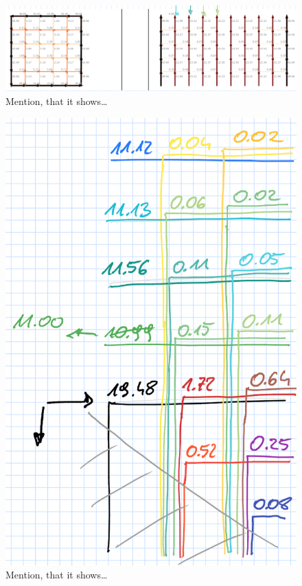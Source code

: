\begin{figure}
  \centering
  \includegraphics[width=0.9\linewidth]{gfx/prototype/coil_y_currents.png}
  \caption{Mention, that it shows\ldots}
  \label{fig:prototype_coil_y_currents}
\end{figure}

\begin{figure}
  \centering
  \includegraphics[width=0.9\linewidth]{gfx/prototype/coil_y_decomposition.png}
  \caption{Mention, that it shows\ldots}
  \label{fig:prototype_coil_y_decomposition}
\end{figure}

